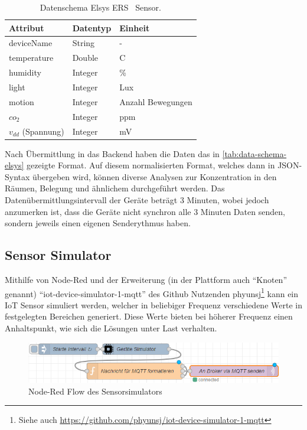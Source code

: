\begin{table}[H]
\centering
\begin{tabular}{|l|l|l|}
\hline
Attribut    & Datentyp & Einheit           \\ \hline
deviceName  & String   & -                 \\ \hline
temperature & Double   & \textdegree{}C     \\ \hline
humidity    & Integer  & \%                \\ \hline
light       & Integer  & Lux               \\ \hline
motion      & Integer  & Anzahl Bewegungen \\ \hline
$co_2$        & Integer  & ppm               \\ \hline
$v_{dd}$ (Spannung)         & Integer  & mV                \\ \hline
\end{tabular}
\caption[Datenschema Elsys ERS \coo{}~Sensor]{Datenschema Elsys ERS \coo{}~Sensor.\footnotemark}
\label{tab:data-schema-elsys}
\end{table}
Nach Übermittlung in das Backend haben die Daten das in \autoref{tab:data-schema-elsys} gezeigte Format. Auf diesem normalisierten Format, welches dann in \ac{JSON}-Syntax übergeben wird, können diverse Analysen zur \coo{} Konzentration in den Räumen, Belegung und ähnlichem durchgeführt werden. Das Datenübermittlungsintervall der Geräte beträgt 3 Minuten, wobei jedoch anzumerken ist, dass die Geräte nicht synchron alle 3 Minuten Daten senden, sondern jeweils einen eigenen Senderythmus haben.


\subsection{Sensor Simulator}\label{chap:iotdevicesim}
Mithilfe von Node-Red und der Erweiterung (in der Plattform auch \enquote{Knoten} genannt) \enquote{iot-device-simulator-1-mqtt} des Github Nutzenden phyunsj\footnote{Siehe auch \url{https://github.com/phyunsj/iot-device-simulator-1-mqtt}} kann ein \ac{IoT} Sensor simuliert werden, welcher in beliebiger Frequenz verschiedene Werte in festgelegten Bereichen generiert. Diese Werte bieten bei höherer Frequenz einen Anhaltspunkt, wie sich die Lösungen unter Last verhalten.
\begin{figure}[H]
\centering
\includegraphics[width=\textwidth]{graphics/Device-Simulator-Flow.png}
\caption{Node-Red Flow des Sensorsimulators}
\label{abb:DeviceSimFlow}
\end{figure}

